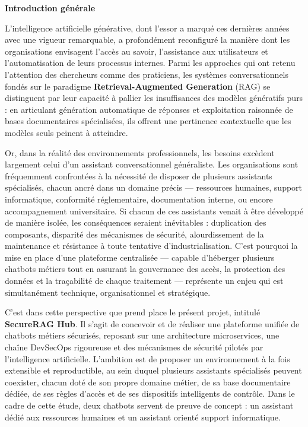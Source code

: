 \textbf{Introduction générale}

L'intelligence artificielle générative, dont l'essor a marqué ces dernières années avec une vigueur remarquable, a profondément reconfiguré la manière dont les organisations envisagent l'accès au savoir, l'assistance aux utilisateurs et l'automatisation de leurs processus internes. Parmi les approches qui ont retenu l'attention des chercheurs comme des praticiens, les systèmes conversationnels fondés sur le paradigme \textbf{Retrieval-Augmented Generation} (RAG) se distinguent par leur capacité à pallier les insuffisances des modèles génératifs purs : en articulant génération automatique de réponses et exploitation raisonnée de bases documentaires spécialisées, ils offrent une pertinence contextuelle que les modèles seuls peinent à atteindre.

Or, dans la réalité des environnements professionnels, les besoins excèdent largement celui d'un assistant conversationnel généraliste. Les organisations sont fréquemment confrontées à la nécessité de disposer de plusieurs assistants spécialisés, chacun ancré dans un domaine précis — ressources humaines, support informatique, conformité réglementaire, documentation interne, ou encore accompagnement universitaire. Si chacun de ces assistants venait à être développé de manière isolée, les conséquences seraient inévitables : duplication des composants, disparité des mécanismes de sécurité, alourdissement de la maintenance et résistance à toute tentative d'industrialisation. C'est pourquoi la mise en place d'une plateforme centralisée — capable d'héberger plusieurs chatbots métiers tout en assurant la gouvernance des accès, la protection des données et la traçabilité de chaque traitement — représente un enjeu qui est simultanément technique, organisationnel et stratégique.

C'est dans cette perspective que prend place le présent projet, intitulé \textbf{SecureRAG Hub}. Il s'agit de concevoir et de réaliser une plateforme unifiée de chatbots métiers sécurisés, reposant sur une architecture microservices, une chaîne DevSecOps rigoureuse et des mécanismes de sécurité pilotés par l'intelligence artificielle. L'ambition est de proposer un environnement à la fois extensible et reproductible, au sein duquel plusieurs assistants spécialisés peuvent coexister, chacun doté de son propre domaine métier, de sa base documentaire dédiée, de ses règles d'accès et de ses dispositifs intelligents de contrôle. Dans le cadre de cette étude, deux chatbots servent de preuve de concept : un assistant dédié aux ressources humaines et un assistant orienté support informatique.

